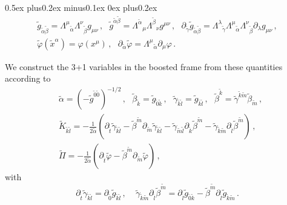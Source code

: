 \documentclass[]{iopart}
\begin{document}
\begin{list}{\rm{\bf ()}}{
                
             \parsep0.5ex plus0.2ex minus0.1ex \itemsep0ex plus0.2ex}
  \begin{gather}
    \tilde{g}_{\tilde{\alpha}\tilde{\beta}}=
      \Lambda^{\mu}{}_{\tilde{\alpha}}\Lambda^{\nu}{}_{\tilde{\beta}}g_{\mu\nu}
      \,,~~~
    \tilde{g}^{\tilde{\alpha}\tilde{\beta}}=
    \Lambda^{\tilde{\alpha}}{}_{\mu}\Lambda^{\tilde{\beta}}{}_{\nu}g^{\mu\nu}
    \,,~~~
    \partial_{\tilde{\gamma}}\tilde{g}_{\tilde{\alpha}\tilde{\beta}}=
    \Lambda^{\lambda}{}_{\tilde{\gamma}}\Lambda^{\mu}{}_{\tilde{\alpha}}
    \Lambda^{\nu}{}_{\tilde{\beta}}\partial_{\lambda}g_{\mu\nu}
    \,, \nonumber\\
     \tilde{\varphi}(\tilde{x}^{\alpha}) = \varphi(x^{\mu})\,,~~~
    \partial_{\tilde{\alpha}}\tilde{\varphi}=
    \Lambda^{\mu}{}_{\tilde{\alpha}} \partial_{\mu}\varphi\,.
  \end{gather}
  \item We construct the 3+1 variables in the boosted frame from these
  quantities according to
  \begin{align}
    &\tilde{\alpha} = \left(-\tilde{g}^{\tilde{0}\tilde{0}}\right)^{-1/2}
    \,,~~~
    \tilde{\beta}_{\tilde{k}}=\tilde{g}_{\tilde{0}\tilde{k}}
    \,,~~~
    \tilde{\gamma}_{\tilde{k}\tilde{l}}=\tilde{g}_{\tilde{k}\tilde{l}}
    \,,~~~
    \tilde{\beta}^{\tilde{k}}=\tilde{\gamma}^{\tilde{k}\tilde{m}}
    \tilde{\beta}_{\tilde{m}}
    \,, \\
    & \tilde{K}_{\tilde{k}\tilde{l}}=
    -\frac{1}{2\tilde{\alpha}}
    \left(
    \partial_{\tilde{t}}\tilde{\gamma}_{\tilde{k}\tilde{l}}
    -\tilde{\beta}^{\tilde{m}}\partial_{\tilde{m}}\tilde{\gamma}_{\tilde{k}\tilde{l}}
    -\tilde{\gamma}_{\tilde{m}\tilde{l}}\partial_{\tilde{k}}\tilde{\beta}^{\tilde{m}}
    -\tilde{\gamma}_{\tilde{k}\tilde{m}}\partial_{\tilde{l}}\tilde{\beta}^{\tilde{m}}
    \right)\,, \nonumber \\
    &\tilde{\Pi} = -\frac{1}{2\tilde{\alpha}}
    \left(
    \partial_{\tilde{t}}\tilde{\varphi}
    - \tilde{\beta}^{\tilde{m}} \partial_{\tilde{m}}\tilde{\varphi}
    \right)\,,
  \end{align}
  with
  \begin{equation}
    \partial_{\tilde{t}}\tilde{\gamma}_{\tilde{k}\tilde{l}}=
    \partial_{\tilde{0}}\tilde{g}_{\tilde{k}\tilde{l}}
    \,,~~~~~
    \tilde{\gamma}_{\tilde{k}\tilde{m}}
    \partial_{\tilde{l}}\tilde{\beta}^{\tilde{m}}
    =
    \partial_{\tilde{l}}\tilde{g}_{\tilde{0}\tilde{k}}
    - \tilde{\beta}^{\tilde{m}}
    \partial_{\tilde{l}}\tilde{g}_{\tilde{k}\tilde{m}}\,.
  \end{equation}

\end{list}
\end{document}
